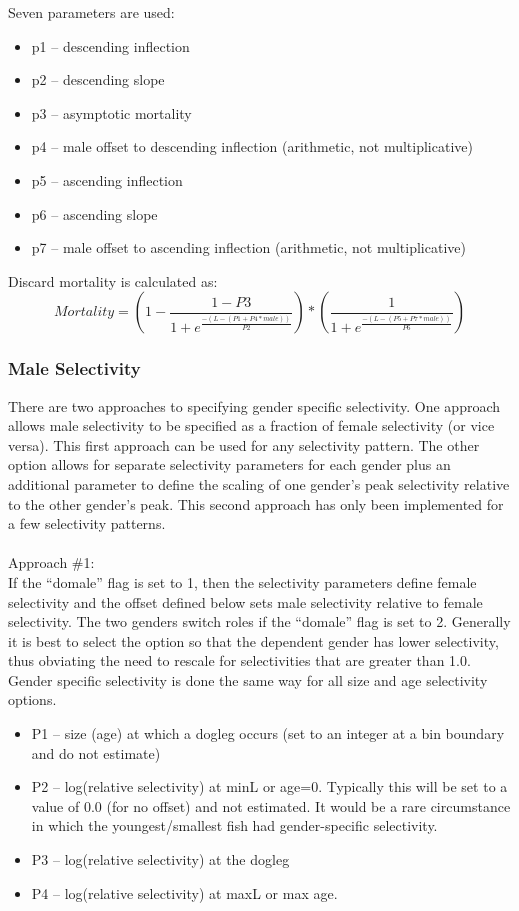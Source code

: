 Seven parameters are used:
\begin{itemize}
	\item p1 – descending inflection
	\item p2 – descending slope
	\item p3 – asymptotic mortality
	\item p4 – male offset to descending inflection (arithmetic, not multiplicative)
	\item p5 – ascending inflection
	\item p6 – ascending slope
	\item p7 – male offset to ascending inflection (arithmetic, not multiplicative)
\end{itemize}

Discard mortality is calculated as:
\begin{equation}
	Mortality = \left(1 - \frac{1-P3}{1+e^{\frac{-(L-(P1+P4*male))}{P2}}}\right)*\left(\frac{1}{1 + e^{\frac{-(L-(P5+P7*male))}{P6}}}\right)
\end{equation}

\subsubsection{Male Selectivity}
There are two approaches to specifying gender specific selectivity.  One approach allows male selectivity to be specified as a fraction of female selectivity (or vice versa).  This first approach can be used for any selectivity pattern.  The other option allows for separate selectivity parameters for each gender plus an additional parameter to define the scaling of one gender’s peak selectivity relative to the other gender’s peak.  This second approach has only been implemented for a few selectivity patterns.\\
\\
Approach \#1:\\
If the “domale” flag is set to 1, then the selectivity parameters define female selectivity and the offset defined below sets male selectivity relative to female selectivity.  The two genders switch roles if the “domale” flag is set to 2.  Generally it is best to select the option so that the dependent gender has lower selectivity, thus obviating the need to rescale for selectivities that are greater than 1.0.  Gender specific selectivity is done the same way for all size and age selectivity options.
\begin{itemize}
	\item P1 – size (age) at which a dogleg occurs (set to an integer at a bin boundary and do not estimate)
	\item P2 – log(relative selectivity) at minL or age=0.  Typically this will be set to a value of 0.0 (for no offset) and not estimated.  It would be a rare circumstance in which the youngest/smallest fish had gender-specific selectivity.
	\item P3 – log(relative selectivity) at the dogleg
	\item P4 – log(relative selectivity) at maxL or max age.
\end{itemize}

